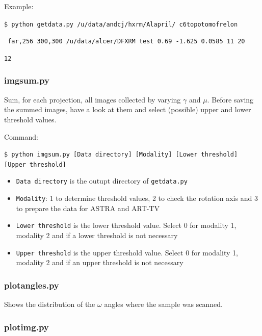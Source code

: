 \documentclass[11pt]{scrartcl}
\begin{document}
Example:

{\texttt{\$ python getdata.py /u/data/andcj/hxrm/Al\textunderscore april/ c6\textunderscore topotomo\textunderscore frelon}}

{\texttt{ \textunderscore far,256 300,300 /u/data/alcer/DFXRM test 0.69 -1.625 0.0585 11 20}}

{\texttt{12}}

\subsubsection{img\textunderscore sum.py}
\label{sec:img_sum}

Sum, for each projection, all images collected by varying $\gamma$ and $\mu$. Before saving the summed images, have a look at them and select (possible) upper and lower threshold values.

Command:

{\texttt{\$ python img\textunderscore sum.py [Data directory] [Modality] [Lower threshold] [Upper threshold]}}

\begin{itemize}
    \item {\texttt{Data directory}} is the outupt directory of {\texttt{getdata.py}}
    \item {\texttt{Modality}}: 1 to determine threshold values, 2 to check the rotation axis and 3 to prepare the data for {\footnotesize{ASTRA}} and {\footnotesize{ART-TV}}
    \item {\texttt{Lower threshold}} is the lower threshold value. Select 0 for modality 1, modality 2 and if a lower threshold is not necessary
    \item {\texttt{Upper threshold}} is the upper threshold value. Select 0 for modality 1, modality 2 and if an upper threshold is not necessary

\end{itemize}

\subsubsection{plot\textunderscore angles.py}

Shows the distribution of the $\omega$ angles where the sample was scanned.

\subsubsection{plot\textunderscore img.py}
\end{document}
